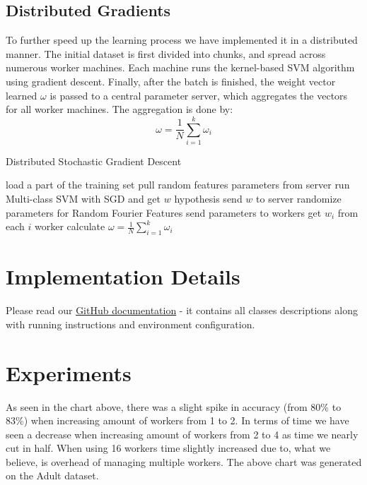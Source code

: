 \documentclass[12pt,a4paper]{article}
\begin{document}
\subsection{Distributed Gradients}
To further speed up the learning process we have implemented it in a distributed manner. The initial dataset is first divided into chunks, and spread across numerous worker machines. Each machine runs the kernel-based SVM algorithm using gradient descent. Finally, after the batch is finished, the weight vector learned $\omega$ is passed to a central parameter server, which aggregates the vectors for all worker machines. The aggregation is done by:
\begin{equation}
        \omega = \frac{1}{N}\sum^{k}_{i=1}\omega_i
\end{equation}

\begin{center}
\end{center}

\begin{algorithm}
        \caption{Distributed Stochastic Gradient Descent}
        \label{dsgd_alg}
        \begin{algorithmic}[1]
                \State load a part of the training set
                \State pull random features parameters from server
                \State run Multi-class SVM with SGD and get $w$ hypothesis
                \State send $w$ to server
                \EndProcedure
                \State randomize parameters for Random Fourier Features
                \State send parameters to workers
                \State get $w_i$ from each $i$ worker
                \State calculate $\omega = \frac{1}{N}\sum^{k}_{i=1}\omega_i$
                \EndProcedure
        \end{algorithmic}
\end{algorithm}

\section{Implementation Details}
Please read our \href{https://github.com/learningduo/distributed_random_features_svm}{GitHub documentation} - it contains all classes descriptions along with running instructions and environment configuration.

\section{Experiments}
\begin{center}
\end{center}
As seen in the chart above, there was a slight spike in accuracy (from 80\% to 83\%) when increasing amount of workers from 1 to 2. In terms of time we have seen a decrease when increasing amount of workers from 2 to 4 as time we nearly cut in half. When using 16 workers time slightly increased due to, what we believe, is overhead of managing multiple workers. The above chart was generated on the Adult dataset.
\end{document}
